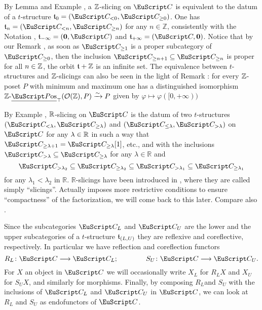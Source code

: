 \begin{example}\label{ex.Z-is-t}
By Lemma  and Example , a $\mathbb{Z} $-slicing on $\C$ is equivalent to the datum of a $t$-structure $\tee_0=(\C_{<0},\C_{\geq 0})$. One has $\tee_n=(\C_{<n},\C_{\geq n})$ for any $n\in \mathbb{Z}$, consistently with the Notation , $\tee_{-\infty}=(\mathbf{0},\C)$ and $\tee_{+\infty}=(\C,\mathbf{0})$. Notice that by our Remark , as soon as $\C_{\ge 1}$ is a proper subcategory of $\C_{\ge 0}$, then the inclusion $\C_{\geq n+1}\subseteq \C_{\geq n}$ is proper for all $n\in\mathbb{Z}$, \ie the orbit $\mathfrak{t} + \mathbb{Z}$ is an infinite set. The equivalence between $t$-structures and $\mathbb{Z}$-slicings can also be seen in the light of Remark : for every $\mathbb{Z}$-poset $P$ with minimum and maximum one has a distinguished isomorphism $\ZPos_{\top}(\mathcal{O}(\Z),P)\xto{\sim}P$ given by $\varphi\mapsto \varphi([0,+\infty))$
\end{example}
\begin{example}\label{what.s.slici}
By Example , $\mathbb{R}$-slicing on $\C$ is the datum of two $t$-structures $(\C_{<\lambda},\C_{\geq \lambda})$ and  $(\C_{\leq \lambda},\C_{> \lambda})$ on $\C$ for any $\lambda\in \mathbb{R}$ in such a way that $\C_{\geq \lambda+1}=\C_{\geq \lambda}[1]$, etc., and with the inclusions $\C_{>\lambda}\subseteq \C_{\geq\lambda}$ for any $\lambda\in \mathbb{R}$ and 
\[
\C_{>\lambda_2}\subseteq \C_{\geq \lambda_2} \subseteq \C_{>\lambda_1}\subseteq \C_{\geq \lambda_1}
\]
for any $\lambda_1<\lambda_2$ in $\mathbb{R}$. $\mathbb{R}$-slicings have been introduced in \cite{Brid}, where they are called simply ``slicings''. Actually \cite{Brid} imposes more restrictive conditions to ensure ``compactness'' of the factorization, we will come back to this later. Compare also \cite{GKR}.
\end{example}

\begin{remark}
Since the subcategories $\C_L$ and  $\C_U$ are the lower and the upper subcategories of a $t$-structure $\mathfrak{t}_{(L,U)}$ they are reflexive and coreflective, respectively. In particular we have reflection and coreflection functors
\[
R_L\colon \C\to \C_L;\qquad\qquad S_U\colon \C\to \C_U.
\]
For $X$ an object in $\C$ we will occasionally write $X_L$ for $R_LX$ and $X_U$ for $S_UX$, and similarly for morphisms. Finally, by composing $R_L$and $S_U$ with the inclusions of $\C_L$ and $\C_U$ in $\C$, we can look at $R_L$ and $S_U$ as endofunctors of $\C$. 
\end{remark}

